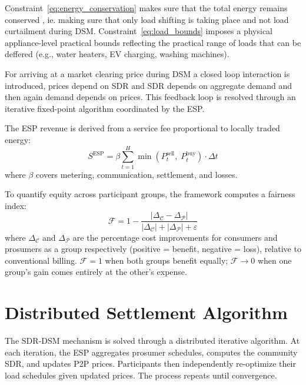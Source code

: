 \documentclass[conference]{IEEEtran}
\begin{document}
Constraint~\eqref{eq:energy_conservation}  makes sure that the total energy remains conserved , ie. making sure that only load shifting is taking place and not load curtailment during DSM. Constraint~\eqref{eq:load_bounds} imposes a physical appliance-level practical bounds reflecting the practical range of  loads that can be deffered (e.g., water heaters, EV charging, washing machines).

For arriving at a market clearing price during DSM a closed loop interaction is introduced, prices depend on SDR and SDR depends on aggregate demand and then again demand depends on prices.  This feedback loop is resolved through an iterative fixed-point algorithm coordinated by the ESP.

The ESP revenue is derived from a service fee proportional to locally traded energy:
\begin{equation}
    S^{\text{ESP}} = \beta \sum_{t=1}^{H} \min(P_t^{\text{sell}},\; P_t^{\text{buy}}) \cdot \Delta t
    \label{eq:esp_revenue}
\end{equation}
where $\beta$ covers metering, communication, settlement, and losses.

To quantify equity across participant groups, the framework computes a fairness index:
\begin{equation}
    \mathcal{F} = 1 - \frac{|\Delta_{\mathcal{C}} - \Delta_{\mathcal{P}}|}{|\Delta_{\mathcal{C}}| + |\Delta_{\mathcal{P}}| + \varepsilon}
    \label{eq:fairness}
\end{equation}
where $\Delta_{\mathcal{C}}$ and $\Delta_{\mathcal{P}}$ are the  percentage cost improvements for consumers and prosumers as a group respectively (positive = benefit, negative = loss), relative to conventional billing. $\mathcal{F} = 1$ when both groups benefit equally; $\mathcal{F} \to 0$ when one group's gain comes entirely at the other's expense.

\section{Distributed Settlement Algorithm}

The SDR-DSM mechanism is solved through a distributed iterative algorithm. At each iteration, the ESP aggregates prosumer schedules, computes the community SDR, and updates P2P prices. Participants then independently re-optimize their load schedules given updated prices. The process repeats until convergence.
\end{document}
